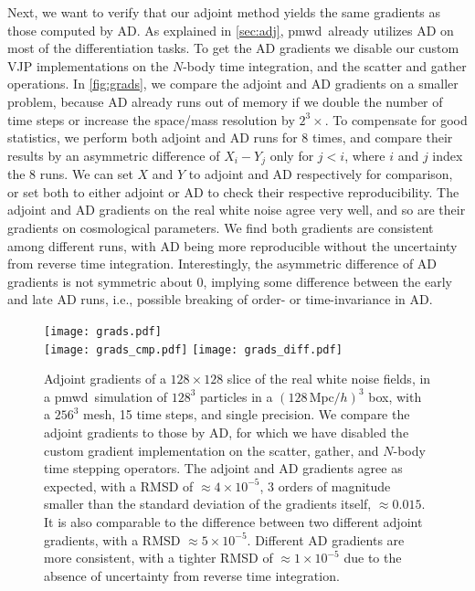 \documentclass[modern, trackchanges, dvipsnames]{aastex631}
\newcommand{\pmwd}{{\usefont{T1}{nova}{m}{sl}pmwd}}
\newcommand{\Mpc}{\mathrm{Mpc}}
\begin{document}
Next, we want to verify that our adjoint method yields the same
gradients as those computed by AD.
As explained in \autoref{sec:adj}, \pmwd\ already utilizes AD on most of
the differentiation tasks.
To get the AD gradients we disable our custom VJP implementations on the
$N$-body time integration, and the scatter and gather operations.
In \autoref{fig:grads}, we compare the adjoint and AD gradients on a
smaller problem, because AD already runs out of memory if we double the
number of time steps or increase the space/mass resolution by
$2^3\times$.
To compensate for good statistics, we perform both adjoint and AD runs
for 8 times, and compare their results by an asymmetric difference of
$X_i - Y_j$ only for $j<i$, where $i$ and $j$ index the 8 runs.
We can set $X$ and $Y$ to adjoint and AD respectively for comparison, or
set both to either adjoint or AD to check their respective
reproducibility.
The adjoint and AD gradients on the real white noise agree very well,
and so are their gradients on cosmological parameters.
We find both gradients are consistent among different runs, with AD
being more reproducible without the uncertainty from reverse time
integration.
Interestingly, the asymmetric difference of AD gradients is not
symmetric about 0, implying some difference between the early and late
AD runs, i.e., possible breaking of order- or time-invariance in AD.


\begin{figure}[t]
\centering
\texttt{[image: grads.pdf]}
\\
\vspace{1em}
\texttt{[image: grads\_cmp.pdf]}
\hfill
\texttt{[image: grads\_diff.pdf]}
\caption{Adjoint gradients of a $128\times128$ slice of the real white
noise fields, in a \pmwd\ simulation of $128^3$ particles in a
$(128\,\Mpc/h)^3$ box, with a $256^3$ mesh, 15 time steps, and single
precision.
We compare the adjoint gradients to those by AD, for which we have
disabled the custom gradient implementation on the scatter, gather, and
$N$-body time stepping operators.
The adjoint and AD gradients agree as expected, with a RMSD of $\approx
4\times10^{-5}$, 3 orders of magnitude smaller than the standard
deviation of the gradients itself, $\approx 0.015$.
It is also comparable to the difference between two different adjoint
gradients, with a RMSD $\approx 5\times10^{-5}$.
Different AD gradients are more consistent, with a tighter RMSD of
$\approx 1\times10^{-5}$ due to the absence of uncertainty from reverse
time integration.
}
\label{fig:grads}
\end{figure}
\end{document}
